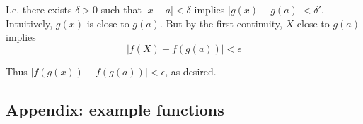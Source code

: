 \vs

I.e. there exists $\delta>0$ such that $|x-a|<\delta$ implies
$|g(x)-g(a)|<\delta'$. Intuitively, $g(x)$ is close to $g(a)$. But by the
first continuity, $X$ close to $g(a)$ implies
\[|f(X)-f(g(a))|<\epsilon\]

Thus $|f(g(x))-f(g(a))|<\epsilon$, as desired.

\subsection{Appendix: example functions}

